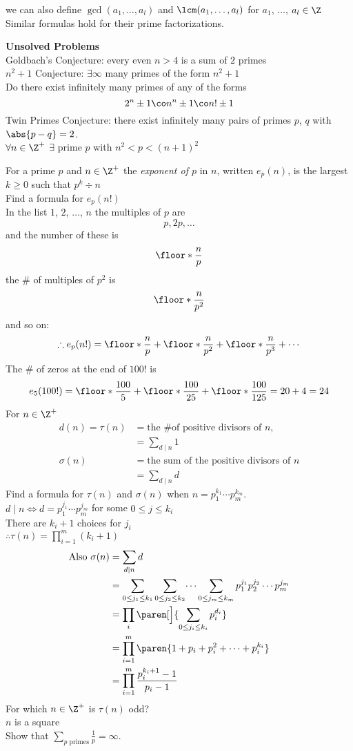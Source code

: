 we can also define $\gcd(a_1,\dotsc,a_l)$ and $\lcm(a_1,\dotsc,a_l)$ for $a_1$, $\dotsc$, $a_l\in\Z$ \\
Similar formulas hold for their prime factorizations.

\textbf{Unsolved Problems} \\
Goldbach's Conjecture: every even $n>4$ is a sum of $2$ primes \\
$n^2+1$ Conjecture: $\exists\infty$ many primes of the form $n^2+1$ \\
Do there exist infinitely many primes of any of the forms
\[ 2^n\pm1\co n^n\pm1\co n!\pm1 \]
Twin Primes Conjecture: there exist infinitely many pairs of primes $p$, $q$ with $\abs{p-q}=2$. \\
$\forall n\in\Z^+$ $\exists$ prime $p$ with $n^2<p<(n+1)^2$

 For a prime $p$ and $n\in\Z^+$ the \emph{exponent of\/ $p$} in $n$, written $e_p(n)$, is the largest $k\geq0$ such that $p^k\div n$ \\
\eg Find a formula for $e_p(n!)$ \\
\soln In the list $1$, $2$, $\dotsc$, $n$ the multiples of $p$ are
\[ p,2p,\dotsc \]
and the number of these is
\[ \floor*{\frac{n}{p}} \]
the \# of multiples of $p^2$ is
\[ \floor*{\frac{n}{p^2}} \]
and so on:
\[ \therefore e_p(n!) = \floor*{\frac{n}{p}}+\floor*{\frac{n}{p^2}}+\floor*{\frac{n}{p^3}}+\dotsb \]
\eg The \# of zeros at the end of $100!$ is
\[ e_5(100!) = \floor*{\frac{100}{5}} + \floor*{\frac{100}{25}} + \floor*{\frac{100}{125}} = 20 + 4 = 24 \]
 For $n\in\Z^+$
\begin{align*}
d(n) = \tau(n) &= \text{the \# of positive divisors of $n$}, \\
&= \sum_{d\mid n}1 \\
\sigma(n) &= \text{the sum of the positive divisors of $n$} \\
&= \sum_{d\mid n}d
\end{align*}
\eg Find a formula for $\tau(n)$ and $\sigma(n)$ when $n=p_1^{k_1}\dotsm p_m^{k_m}$. \\
\soln $d\mid n\iff d=p_1^{j_1}\dotsm p_m^{j_m}$ for some $0\leq j\leq k_i$ \\
There are $k_i+1$ choices for $j_i$ \\
$\therefore\tau(n)=\prod_{i=1}^m(k_i+1)$
\begin{align*}
\text{Also } \sigma(n) &= \sum_{d\mid n}d \\
&= \sum_{0\leq j_1\leq k_1}\sum_{0\leq j_2\leq k_2}\dotsi\sum_{0\leq j_m\leq k_m}p_1^{j_1}p_2^{j_2}\dotsm p_m^{j_m} \\
&= \prod_i\paren[\Big]{\sum_{0\leq j_i\leq k_i}p_i^{d_i}} \\
&= \prod_{i=1}^m\paren{1+p_i+p_i^2+\dotsb+p_i^{k_i}} \\
&= \prod_{i=1}^m\frac{p_i^{k_i+1}-1}{p_i-1}
\end{align*}
\eg For which $n\in\Z^+$ is $\tau(n)$ odd? \\
\ans $n$ is a square \\
\eg Show that $\sum_{\text{$p$ primes}}\frac{1}{p}=\infty$.
